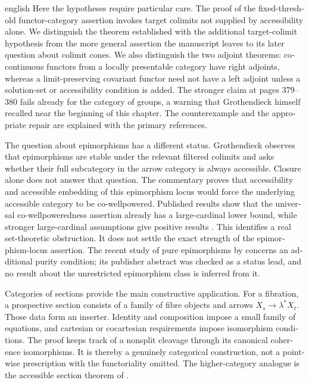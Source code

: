 \begin{otherlanguage}{english}
\begin{otherlanguage*}{english}
Here the hypotheses require particular care. The proof of the fixed-threshold functor-category assertion invokes target colimits not supplied by accessibility alone. We distinguish the theorem established with the additional target-colimit hypothesis from the more general assertion the manuscript leaves to its later question about colimit cones. We also distinguish the two adjoint theorems: cocontinuous functors from a locally presentable category have right adjoints, whereas a limit-preserving covariant functor need not have a left adjoint unless a solution-set or accessibility condition is added. The stronger claim at pages 379--380 fails already for the category of groups, a warning that Grothendieck himself recalled near the beginning of this chapter. The counterexample and the appropriate repair are explained with the primary references.

The question about epimorphisms has a different status. Grothendieck observes that epimorphisms are stable under the relevant filtered colimits and asks whether their full subcategory in the arrow category is always accessible. Closure alone does not answer that question. The commentary proves that accessibility and accessible embedding of this epimorphism locus would force the underlying accessible category to be co-wellpowered. Published results show that the universal co-wellpoweredness assertion already has a large-cardinal lower bound, while stronger large-cardinal assumptions give positive results \citep{BagariaCasacubertaMathiasRosicky2015}. This identifies a real set-theoretic obstruction. It does not settle the exact strength of the epimorphism-locus assertion. The recent study of pure epimorphisms by \citet{Positselski2026Pure} concerns an additional purity condition; its publisher abstract was checked as a status lead, and no result about the unrestricted epimorphism class is inferred from it.

Categories of sections provide the main constructive application. For a fibration, a prospective section consists of a family of fibre objects and arrows $X_s\to\lambda^*X_t$. Those data form an inserter. Identity and composition impose a small family of equations, and cartesian or cocartesian requirements impose isomorphism conditions. The proof keeps track of a nonsplit cleavage through its canonical coherence isomorphisms. It is thereby a genuinely categorical construction, not a pointwise prescription with the functoriality omitted. The higher-category analogue is the accessible section theorem of \citet[Proposition 5.4.7.11]{Lurie2009HTT}.


\end{otherlanguage*}
\end{otherlanguage}
